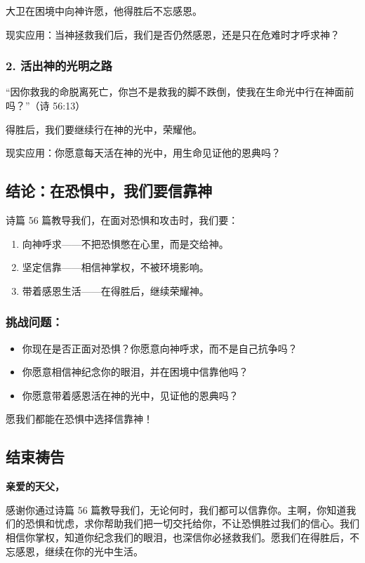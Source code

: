 \documentclass[a4paper, 12pt]{article}
\begin{document}
大卫在困境中向神许愿，他得胜后不忘感恩。

现实应用：当神拯救我们后，我们是否仍然感恩，还是只在危难时才呼求神？
\subsubsection*{2. 活出神的光明之路}
“因你救我的命脱离死亡，你岂不是救我的脚不跌倒，使我在生命光中行在神面前吗？”（诗 56:13）

得胜后，我们要继续行在神的光中，荣耀他。

现实应用：你愿意每天活在神的光中，用生命见证他的恩典吗？
\subsection*{结论：在恐惧中，我们要信靠神}
诗篇 56 篇教导我们，在面对恐惧和攻击时，我们要：
\begin{enumerate}
    \item 向神呼求——不把恐惧憋在心里，而是交给神。

    \item 坚定信靠——相信神掌权，不被环境影响。

    \item 带着感恩生活——在得胜后，继续荣耀神。

\end{enumerate}
\subsubsection*{挑战问题：}
\begin{itemize}
    \item 你现在是否正面对恐惧？你愿意向神呼求，而不是自己抗争吗？

    \item 你愿意相信神纪念你的眼泪，并在困境中信靠他吗？

    \item 你愿意带着感恩活在神的光中，见证他的恩典吗？

\end{itemize}

愿我们都能在恐惧中选择信靠神！

\subsection*{结束祷告}
\textbf{亲爱的天父，}

感谢你通过诗篇 56 篇教导我们，无论何时，我们都可以信靠你。主啊，你知道我们的恐惧和忧虑，求你帮助我们把一切交托给你，不让恐惧胜过我们的信心。我们相信你掌权，知道你纪念我们的眼泪，也深信你必拯救我们。愿我们在得胜后，不忘感恩，继续在你的光中生活。
\end{document}
